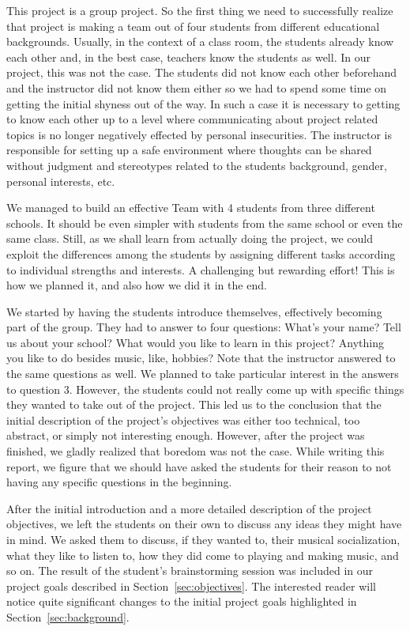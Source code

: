 \documentclass[onecolumn,nocopyrightspace,preprint]{sigplanconf}
\begin{document}
This project is a group project. So the first thing we need to successfully
realize that project is making a team out of four students from different
educational backgrounds. Usually, in the context of a class room, the students
already know each other and, in the best case, teachers know the students as
well. In our project, this was not the case. The students did not know each
other beforehand and the instructor did not know them either so we had to
spend some time on getting the initial shyness out of the way.
In such a case it is necessary to getting to know each other up to a level
where communicating about project related topics is no longer negatively
effected by personal insecurities. The instructor is responsible for setting
up a safe environment where thoughts can be shared without judgment and
stereotypes related to the students background, gender, personal interests, etc.

We managed to build an effective Team with 4 students from three different
schools.  It should be even simpler with students from the same school or even
the same class. Still, as we shall learn from actually doing the project, we
could exploit the differences among the students by assigning different tasks
according to individual strengths and interests. A challenging but rewarding
effort! This is how we planned it, and also how we did it in the end. 

We started by having the students introduce themselves, effectively becoming
part of the group. They had to answer to four questions: What's your name?
Tell us about your school?  What would you like to learn in this project?
Anything you like to do besides music, like, hobbies? Note that the instructor
answered to the same questions as well.  We planned to take particular
interest in the answers to question 3. However, the students could not really
come up with specific things they wanted to take out of the project. This led
us to the conclusion that the initial description of the project's objectives
was either too technical, too abstract, or simply not interesting enough.
However, after the project was finished, we gladly realized that boredom was
not the case. While writing this report, we figure that we should have asked
the students for their reason to not having any specific questions in the
beginning.

After the initial introduction and a more detailed description of the project
objectives, we left the students on their own to discuss any ideas they might
have in mind. We asked them to discuss, if they wanted to, their musical
socialization, what they like to listen to, how they did come to playing and
making music, and so on. The result of the student's brainstorming session
was included in our project goals described in Section~\ref{sec:objectives}.
The interested reader will notice quite significant changes to the initial
project goals highlighted in Section~\ref{sec:background}.
\end{document}
